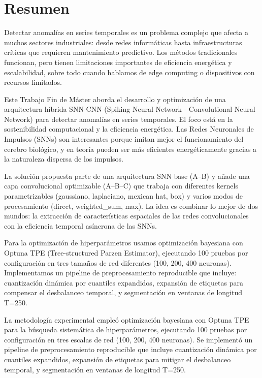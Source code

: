\chapter*{Resumen}
\label{chap:resumen}


Detectar anomalías en series temporales es un problema complejo que afecta a muchos sectores industriales: desde redes informáticas hasta infraestructuras críticas que requieren mantenimiento predictivo. Los métodos tradicionales funcionan, pero tienen limitaciones importantes de eficiencia energética y escalabilidad, sobre todo cuando hablamos de edge computing o dispositivos con recursos limitados.

Este Trabajo Fin de Máster aborda el desarrollo y optimización de una arquitectura híbrida SNN-CNN (Spiking Neural Network - Convolutional Neural Network) para detectar anomalías en series temporales. El foco está en la sostenibilidad computacional y la eficiencia energética. Las Redes Neuronales de Impulsos (SNNs) son interesantes porque imitan mejor el funcionamiento del cerebro biológico, y en teoría pueden ser más eficientes energéticamente gracias a la naturaleza dispersa de los impulsos.

La solución propuesta parte de una arquitectura SNN base (A--B) y añade una capa convolucional optimizable (A--B--C) que trabaja con diferentes kernels parametrizables (gaussiano, laplaciano, mexican hat, box) y varios modos de procesamiento (direct, weighted\_sum, max). La idea es combinar lo mejor de dos mundos: la extracción de características espaciales de las redes convolucionales con la eficiencia temporal asíncrona de las SNNs.

Para la optimización de hiperparámetros usamos optimización bayesiana con Optuna TPE (Tree-structured Parzen Estimator), ejecutando 100 pruebas por configuración en tres tamaños de red diferentes (100, 200, 400 neuronas). Implementamos un pipeline de preprocesamiento reproducible que incluye: cuantización dinámica por cuantiles expandidos, expansión de etiquetas para compensar el desbalanceo temporal, y segmentación en ventanas de longitud T=250.

La metodología experimental empleó optimización bayesiana con Optuna TPE para la búsqueda sistemática de hiperparámetros, ejecutando 100 pruebas por configuración en tres escalas de red (100, 200, 400 neuronas). Se implementó un pipeline de preprocesamiento reproducible que incluye cuantización dinámica por cuantiles expandidos, expansión de etiquetas para mitigar el desbalanceo temporal, y segmentación en ventanas de longitud T=250.

